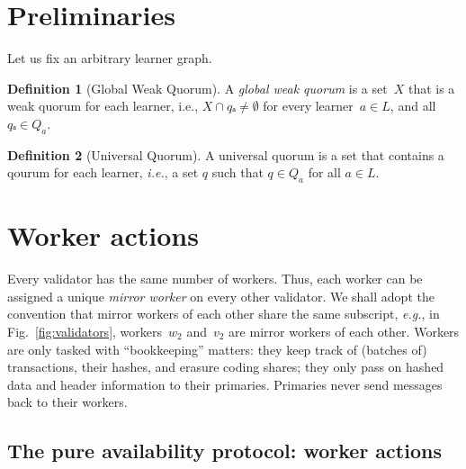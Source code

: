 \documentclass{article}
\theoremstyle{definition}
\newtheorem{definition}{Definition}
\newcommand{\ie}[1][]{\emph{i.e.}, }
\newcommand{\eg}[1][]{\emph{e.g.}, }
\newcommand{\fig}[1][]{Fig.~}
\newcommand{\Learner}{%
  \ensuremath{L}
}
\newcommand{\Q}[1]{%
  Q_{#1}%
}
\begin{document}
\section{Preliminaries}
\label{sec:preliminaries}

Let us fix an arbitrary learner graph. 

\begin{definition}[Global Weak Quorum]
  \label{def:global-weak-quorum}
  A %
  \emph{global weak quorum} %
  is a set~\(X\) that is a weak quorum for each learner,  %
  i.e., \(X ∩ qₐ ≠ ∅\) %
  for every learner~\(a ∈ \Learner\), and %
  all \(qₐ ∈ \Q{a}\).
\end{definition}

\begin{definition}[Universal Quorum]
  \label{def:universal-quorum}
  A universal quorum is a set
  that contains a qourum for each learner,
  \ie a set \(q\) such that \(q ∈ \Q a\)
  for all \(a ∈\Learner\). 
\end{definition}



\section{Worker actions}
\label{sec:worker-actions}
Every validator has the same number of workers. 
Thus,
each worker can be assigned a unique \emph{mirror worker} 
on every other validator.
We shall adopt the convention that
mirror workers of each other share the same subscript,
\eg in \fig\ref{fig:validators},
workers~\(w_2\) and~\(v_2\) are mirror workers of each other.
Workers are only tasked with “bookkeeping” matters: 
they keep track of (batches of) transactions,
their hashes,
and erasure coding shares;
they only pass on hashed data and header information 
to their primaries. 
Primaries never send messages back to their workers. 


\subsection{The pure availability protocol: worker actions}
\label{sec:base-protocol}
\end{document}
